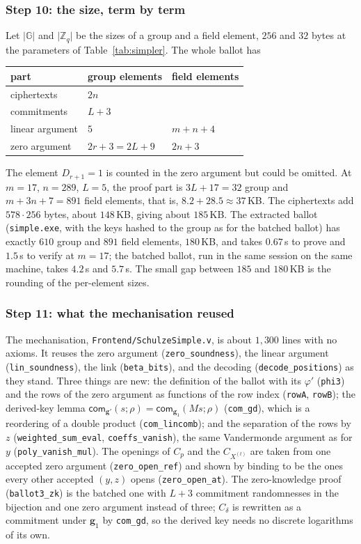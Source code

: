 \documentclass[11pt,a4paper]{article}
\newcommand{\G}{\mathbb{G}}
\newcommand{\Z}{\mathbb{Z}}
\newcommand{\com}{\mathsf{com}}
\newcommand{\rocq}[1]{\texttt{#1}}
\theoremstyle{remark}
\begin{document}
\subsubsection*{Step 10: the size, term by term}
Let $\lvert \G \rvert$ and $\lvert \Z_q \rvert$ be the sizes of a group and
a field element, $256$ and $32$ bytes at the parameters of
Table~\ref{tab:simpler}. The whole ballot has
\begin{center}
\begin{tabular}{@{}lll@{}}
\toprule
part & group elements & field elements \\
\midrule
ciphertexts & $2n$ & \\
commitments & $L + 3$ & \\
linear argument & $5$ & $m + n + 4$ \\
zero argument & $2r + 3 = 2L + 9$ & $2n + 3$ \\
\bottomrule
\end{tabular}
\end{center}
The element $D_{r+1} = 1$ is counted in the zero argument but could be
omitted. At $m = 17$, $n = 289$, $L = 5$, the proof part is $3L + 17 = 32$
group and $m + 3n + 7 = 891$ field elements, that is, $8.2 + 28.5 \approx
37$\,KB. The ciphertexts add $578 \cdot 256$ bytes, about $148$\,KB, giving
about $185$\,KB. The extracted ballot (\rocq{simple.exe}, with the keys
hashed to the group as for the batched ballot) has exactly $610$ group and
$891$ field elements, $180$\,KB, and takes $0.67$\,s to prove and
$1.5$\,s to verify at $m = 17$; the batched ballot, run in the same
session on the same machine, takes $4.2$\,s and $5.7$\,s. The small gap
between $185$ and $180$\,KB is the rounding of the per-element sizes.

\subsubsection*{Step 11: what the mechanisation reused}
The mechanisation, \rocq{Frontend/SchulzeSimple.v}, is about $1{,}300$
lines with no axioms. It reuses the zero argument
(\rocq{zero\_soundness}), the linear argument (\rocq{lin\_soundness}),
the link (\rocq{beta\_bits}), and the decoding
(\rocq{decode\_positions}) as they stand. Three things are new: the
definition of the ballot with its $\varphi'$ (\rocq{phi3}) and the rows
of the zero argument as functions of the row index (\rocq{rowA},
\rocq{rowB}); the derived-key lemma $\com_{\mathbf{g}'}(s; \rho) =
\com_{\mathbf{g}_1}(Ms; \rho)$ (\rocq{com\_gd}), which is a reordering of
a double product (\rocq{com\_lincomb}); and the separation of the rows by
$z$ (\rocq{weighted\_sum\_eval}, \rocq{coeffs\_vanish}), the same
Vandermonde argument as for $y$ (\rocq{poly\_vanish\_mul}). The openings
of $C_p$ and the $C_{X^{(t)}}$ are taken from one accepted zero argument
(\rocq{zero\_open\_ref}) and shown by binding to be the ones every other
accepted $(y, z)$ opens (\rocq{zero\_open\_at}). The zero-knowledge proof
(\rocq{ballot3\_zk}) is the batched one with $L + 3$ commitment
randomnesses in the bijection and one zero argument instead of three;
$C_\delta$ is rewritten as a commitment under $\mathbf{g}_1$ by
\rocq{com\_gd}, so the derived key needs no discrete logarithms of its
own.
\end{document}
